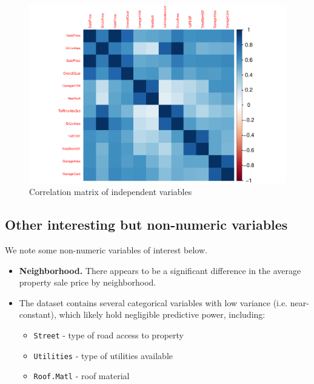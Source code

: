 \documentclass[aoas]{imsart}
\numberwithin{equation}{section}
\theoremstyle{plain}
\theoremstyle{remark}
\begin{document}
\begin{figure}
\centering
\includegraphics{STAT-444-FINAL-PROJECT-PROPOSAL_files/figure-latex/unnamed-chunk-6-1.pdf}
\caption{Correlation matrix of independent variables\label{}}
\end{figure}

\hfill\break

\hypertarget{other-interesting-but-non-numeric-variables}{%
\subsection{Other interesting but non-numeric
variables}\label{other-interesting-but-non-numeric-variables}}

\hfill\break
\hfill\break
We note some non-numeric variables of interest below.

\begin{itemize}
    \item \textbf{Neighborhood.} There appears to be a significant difference in the average property sale price by neighborhood.
\vspace{0.2cm}
\item The dataset contains several categorical variables with low variance (i.e. near-constant), which likely hold negligible predictive power, including:
\vspace{0.2cm}
\begin{itemize}
    \item \texttt{Street} - type of road access to property
    \item \texttt{Utilities} - type of utilities available
    \item \texttt{Roof.Matl} - roof material
\end{itemize}
\end{itemize}
\end{document}
